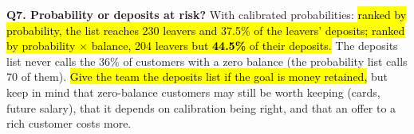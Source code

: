 \documentclass[10pt,a4paper]{article}
\newcommand{\q}[1]{\textbf{\color{blue!50!black}#1}}
\begin{document}
\vspace{3pt}
\q{Q7. Probability or deposits at risk?} With calibrated probabilities: \hl{ranked by probability, the list reaches 230
leavers and 37.5\% of the leavers' deposits; ranked by probability $\times$ balance, 204 leavers but \textbf{44.5\%} of
their deposits.} The deposits list never calls the 36\% of customers with a zero balance (the probability list calls 70
of them). \hl{Give the team the deposits list if the goal is money retained,} but keep in mind that zero-balance customers
may still be worth keeping (cards, future salary), that it depends on calibration being right, and that an offer to a
rich customer costs more.
\end{document}
